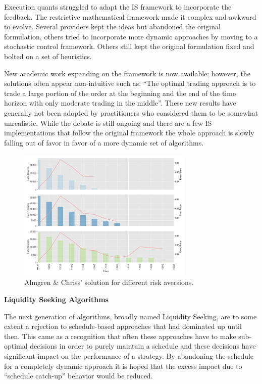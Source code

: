 Execution quants struggled to adapt the IS framework to incorporate the feedback. The restrictive mathematical framework made it complex and awkward to evolve. Several providers kept the ideas but abandoned the original formulation, others tried to incorporate more dynamic approaches by moving to a stochastic control framework. Others still kept the original formulation fixed and bolted on a set of heuristics.

New academic work expanding on the framework is now available; however, the solutions often appear non-intuitive such as: ``The optimal trading approach is to trade a large portion of the order at the beginning and the end of the time horizon with only moderate trading in the middle''. These new results have generally not been  adopted by practitioners who considered them to be somewhat unrealistic. While the debate is still ongoing and there are a few IS implementations that follow the original framework the whole approach is slowly falling out of favor in favor of a more dynamic set of algorithms. \twomedskip

	\begin{figure}[!ht]
	\centering
	\includegraphics[width=0.75\textwidth]{chapters/chapter_exec_models/figures/is.png} 
	\caption{Almgren \& Chriss' solution for different risk aversions. \label{fig:is}}
	\end{figure}



\noindent\textbf{Liquidity Seeking Algorithms} \twomedskip


The next generation of algorithms, broadly named Liquidity Seeking, are to some extent a rejection to schedule-based approaches that had dominated up until then. This came as a recognition that often these approaches have to make sub-optimal decisions in order to purely maintain a schedule and these decisions have significant impact on the performance of a strategy. By abandoning the schedule for a completely dynamic approach it is hoped that the excess impact due to ``schedule catch-up'' behavior would be reduced.

